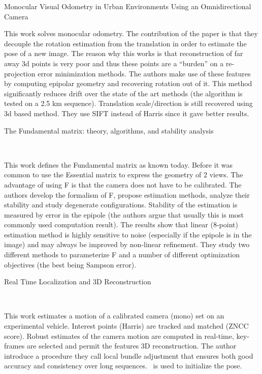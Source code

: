 \documentclass[10pt]{article}         %
\begin{document}
\begin{enumerate}
  {\Large \item Monocular Visual Odometry in Urban Environments Using
    an Omnidirectional Camera} \cite{tardif2008monocular}

  This work solves monocular odometry.  The contribution of the paper
  is that they decouple the rotation estimation from the translation
  in order to estimate the pose of a new image.  The reason why this
  works is that reconstruction of far away 3d points is very poor and
  thus these points are a ``burden'' on a re-projection error
  minimization methods.  The authors make use of these features by
  computing epipolar geometry and recovering rotation out of it.  This
  method significantly reduces drift over the state of the art methods
  (the algorithm is tested on a 2.5 km sequence).  Translation
  scale/direction is still recovered using 3d based method.  They use
  SIFT instead of Harris since it gave better results.

  {\Large \item The Fundamental matrix: theory, algorithms, and
    stability analysis}~\cite{luong1996fundamental}

  This work defines the Fundamental matrix as known today.  Before it
  was common to use the Essential matrix to express the geometry of 2
  views.  The advantage of using F is that the camera does not have to
  be calibrated.  The authors develop the formalism of F, propose
  estimation methods, analyze their stability and study degenerate
  configurations.  Stability of the estimation is measured by error in
  the epipole (the authors argue that usually this is most commonly
  used computation result).  The results show that linear (8-point)
  estimation method is highly sensitive to noise (especially if the
  epipole is in the image) and may always be improved by non-linear
  refinement.  They study two different methods to parameterize F and
  a number of different optimization objectives (the best being
  Sampson error).

  {\Large \item Real Time Localization and 3D
    Reconstruction}~\cite{mouragnon2006real}

  This work estimates a motion of a calibrated camera (mono) set on an
  experimental vehicle.  Interest points (Harris) are tracked and
  matched (ZNCC score). Robust estimates of the camera motion are
  computed in real-time, key-frames are selected and permit the
  features 3D reconstruction.  The author introduce a procedure they
  call local bundle adjustment that ensures both good accuracy and
  consistency over long sequences.~\cite{nister2004efficient} is used
  to initialize the pose.


\end{enumerate}
\end{document}

